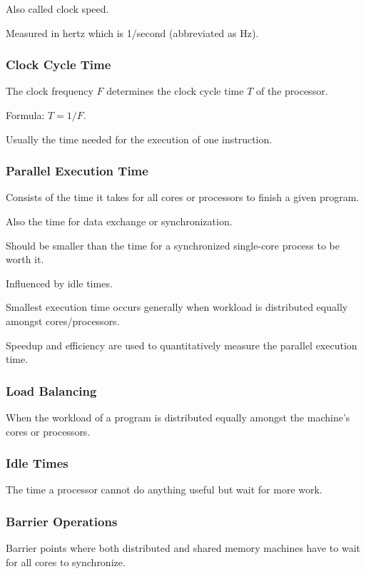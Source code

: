 \documentclass{article}
\begin{document}
Also called clock speed.

Measured in hertz which is 1/second (abbreviated as Hz).

\subsubsection{Clock Cycle Time}

The clock frequency \( F \) determines the clock cycle time \( T \) of the processor.

Formula: \( T = 1/F \).

Usually the time needed for the execution of one instruction.

\subsubsection{Parallel Execution Time}

Consists of the time it takes for all cores or processors to finish a given program.

Also the time for data exchange or synchronization.

Should be smaller than the time for a synchronized single-core process to be worth it.

Influenced by idle times.

Smallest execution time occurs generally when workload is distributed equally amongst cores/processors.

Speedup and efficiency are used to quantitatively measure the parallel execution time.

\subsubsection{Load Balancing}

When the workload of a program is distributed equally amongst the machine's cores or processors.

\subsubsection{Idle Times}

The time a processor cannot do anything useful but wait for more work.

\subsubsection{Barrier Operations}

Barrier points where both distributed and shared memory machines have to wait for all cores to synchronize.
\end{document}
